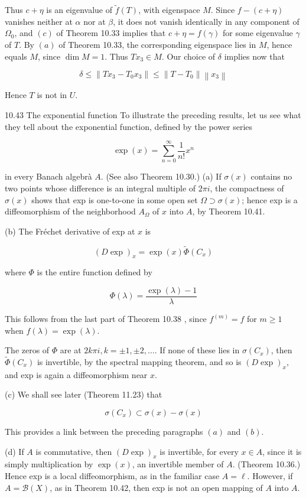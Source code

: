 \documentclass[10pt]{article}
\begin{document}
Thus $c+\eta$ is an eigenvalue of $\tilde{f}(T)$, with eigenspace $M$. Since $f-(c+\eta)$ vanishes neither at $\alpha$ nor at $\beta$, it does not vanish identically in any component of $\Omega_{0}$, and $(c)$ of Theorem 10.33 implies that $c+\eta=f(\gamma)$ for some eigenvalue $\gamma$ of $T$. By $(a)$ of Theorem 10.33, the corresponding eigenspace lies in $M$, hence equals $M$, since $\operatorname{dim} M=1$. Thus $T x_{3} \in M$. Our choice of $\delta$ implies now that

$$
\delta \leq\left\|T x_{3}-T_{0} x_{3}\right\| \leq\left\|T-T_{0}\right\|\left\|x_{3}\right\|
$$

Hence $T$ is not in $U$.

10.43 The exponential function To illustrate the preceding results, let us see what they tell about the exponential function, defined by the power series

$$
\exp (x)=\sum_{n=0}^{\infty} \frac{1}{n !} x^{n}
$$

in every Banach algebrà $A$. (See also Theorem 10.30.)
(a) If $\sigma(x)$ contains no two points whose difference is an integral multiple of $2 \pi i$, the compactness of $\sigma(x)$ shows that exp is one-to-one in some open set $\Omega \supset \sigma(x)$; hence exp is a diffeomorphism of the neighborhood $A_{\Omega}$ of $x$ into $A$, by Theorem 10.41.

(b) The Fréchet derivative of exp at $x$ is

$$
(D \exp )_{x}=\exp (x) \widetilde{\Phi}\left(C_{x}\right)
$$

where $\Phi$ is the entire function defined by

$$
\Phi(\lambda)=\frac{\exp (\lambda)-1}{\lambda}
$$

This follows from the last part of Theorem 10.38 , since $f^{(m)}=f$ for $m \geq 1$ when $f(\lambda)=\exp (\lambda)$.

The zeros of $\Phi$ are at $2 k \pi i, k= \pm 1, \pm 2, \ldots$. If none of these lies in $\sigma\left(C_{x}\right)$, then $\widetilde{\Phi}\left(C_{x}\right)$ is invertible, by the spectral mapping theorem, and so is $(D \exp )_{x}$, and exp is again a diffeomorphism near $x$.

(c) We shall see later (Theorem 11.23) that

$$
\sigma\left(C_{x}\right) \subset \sigma(x)-\sigma(x)
$$

This provides a link between the preceding paragraphs $(a)$ and $(b)$.

(d) If $A$ is commutative, then $(D \exp )_{x}$ is invertible, for every $x \in A$, since it is simply multiplication by $\exp (x)$, an invertible member of $A$. (Theorem 10.36.) Hence exp is a local diffeomorphism, as in the familiar case $A=\ell$. However, if $A=\mathscr{B}(X)$, as in Theorem 10.42, then exp is not an open mapping of $A$ into $A$.
\end{document}
